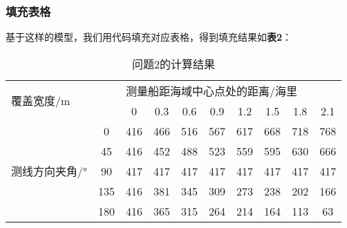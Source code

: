 \documentclass{cumcmthesis}
\begin{document}
\subsubsection{填充表格}
基于这样的模型，我们用代码填充对应表格，得到填充结果如\textbf{表2}：
\begin{table}[!h]
\centering
\caption{问题2的计算结果}
\label{tab:my-table}
\begin{tabular}{|lc|cccccccc|}
\hline
\multicolumn{2}{|l|}{\multirow{2}{*}{覆盖宽度/m}}         & \multicolumn{8}{l|}{测量船距海域中心点处的距离/海里}                                                                                                                                                            \\ \cline{3-10} 
\multicolumn{2}{|l|}{}                                & \multicolumn{1}{c|}{0}   & \multicolumn{1}{c|}{0.3} & \multicolumn{1}{c|}{0.6} & \multicolumn{1}{c|}{0.9} & \multicolumn{1}{c|}{1.2} & \multicolumn{1}{c|}{1.5} & \multicolumn{1}{c|}{1.8} & 2.1 \\ \hline
\multicolumn{1}{|l|}{\multirow{8}{*}{测线方向夹角/°}} & 0   & \multicolumn{1}{c|}{416} & \multicolumn{1}{c|}{466} & \multicolumn{1}{c|}{516} & \multicolumn{1}{c|}{567} & \multicolumn{1}{c|}{617} & \multicolumn{1}{c|}{668} & \multicolumn{1}{c|}{718} & 768 \\ \cline{2-10} 
\multicolumn{1}{|l|}{}                          & 45  & \multicolumn{1}{c|}{416} & \multicolumn{1}{c|}{452} & \multicolumn{1}{c|}{488} & \multicolumn{1}{c|}{523} & \multicolumn{1}{c|}{559} & \multicolumn{1}{c|}{595} & \multicolumn{1}{c|}{630} & 666 \\ \cline{2-10} 
\multicolumn{1}{|l|}{}                          & 90  & \multicolumn{1}{c|}{417} & \multicolumn{1}{c|}{417} & \multicolumn{1}{c|}{417} & \multicolumn{1}{c|}{417} & \multicolumn{1}{c|}{417} & \multicolumn{1}{c|}{417} & \multicolumn{1}{c|}{417} & 417 \\ \cline{2-10} 
\multicolumn{1}{|l|}{}                          & 135 & \multicolumn{1}{c|}{416} & \multicolumn{1}{c|}{381} & \multicolumn{1}{c|}{345} & \multicolumn{1}{c|}{309} & \multicolumn{1}{c|}{273} & \multicolumn{1}{c|}{238} & \multicolumn{1}{c|}{202} & 166 \\ \cline{2-10} 
\multicolumn{1}{|l|}{}                          & 180 & \multicolumn{1}{c|}{416} & \multicolumn{1}{c|}{365} & \multicolumn{1}{c|}{315} & \multicolumn{1}{c|}{264} & \multicolumn{1}{c|}{214} & \multicolumn{1}{c|}{164} & \multicolumn{1}{c|}{113} & 63  \\ \cline{2-10} 

\end{tabular}
\end{table}
\end{document}
